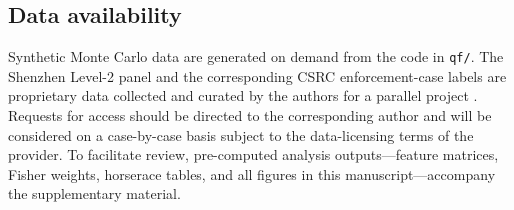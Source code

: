 \documentclass[11pt,a4paper]{article}
\theoremstyle{definition}
\theoremstyle{remark}
\newcommand{\1}{\mathbf{1}}
\begin{document}
\subsection{Data availability}
Synthetic Monte Carlo data are generated on demand from the code in \texttt{qf/}. The Shenzhen Level-2 panel and the corresponding CSRC enforcement-case labels are proprietary data collected and curated by the authors for a parallel project \citep{dai2026sdfmm}. Requests for access should be directed to the corresponding author and will be considered on a case-by-case basis subject to the data-licensing terms of the provider. To facilitate review, pre-computed analysis outputs---feature matrices, Fisher weights, horserace tables, and all figures in this manuscript---accompany the supplementary material.
\end{document}
